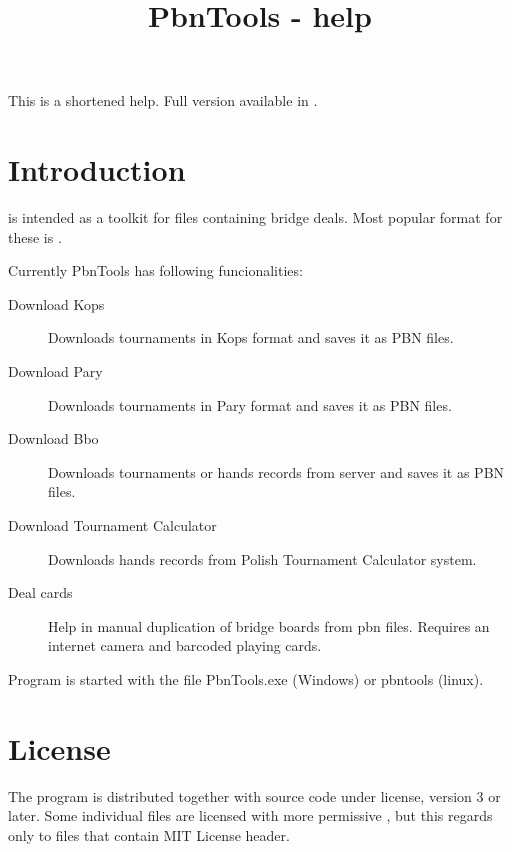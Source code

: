 \documentclass[polish,a4paper,11pt,oneside]{article}
\begin{document}
\title{PbnTools - help}
\author{\null}
\date{\null}


\maketitle

This is a shortened help. Full version available in
.

\tableofcontents

\section{Introduction}
 is intended as a toolkit for files containing bridge deals.
Most popular format for these is .

Currently PbnTools has following funcionalities:

\begin{description}
\item[Download Kops]
  Downloads tournaments in Kops format and saves it as PBN files.
\item[Download Pary]
  Downloads tournaments in Pary format and saves it as PBN files.
\item[Download Bbo]
  Downloads tournaments or hands records from \bbolink
  server and saves it as PBN files.
\item[Download Tournament Calculator]
  Downloads hands records from Polish Tournament Calculator system.
\item[Deal cards]
  Help in manual duplication of bridge boards from pbn files.
  Requires an internet camera and barcoded playing cards.
\end{description}

Program is started with the file PbnTools.exe (Windows) or pbntools (linux).

\section{License}
The program is distributed together with source code
under  license,
version 3 or later.
Some individual files are licensed with more permissive
,
but this regards only to files that contain MIT License header.
\end{document}
